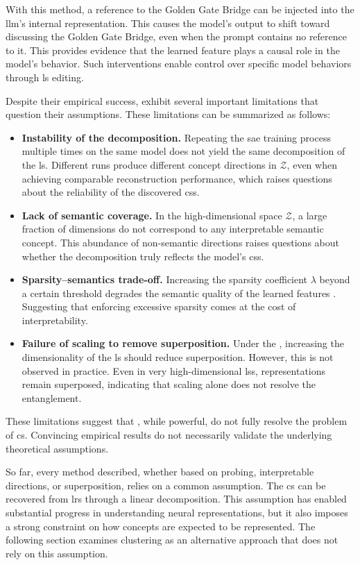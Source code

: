 With this method, a reference to the Golden Gate Bridge can be injected into the \gls{llm}'s internal representation.
This causes the model's output to shift toward discussing the Golden Gate Bridge, even when the prompt contains no reference to it.
This provides evidence that the learned feature plays a causal role in the model's behavior.
Such interventions enable control over specific model behaviors through \gls{ls} editing.

Despite their empirical success, \SuperpositionHypothesisName exhibit several important limitations that question their assumptions. 
These limitations can be summarized as follows:
\begin{itemize}
    \item \textbf{Instability of the decomposition.}
    Repeating the \gls{sae} training process multiple times on the same model does not yield the same decomposition of the \gls{ls}.
    Different runs produce different concept directions in $\mathcal{Z}$, even when achieving comparable reconstruction performance, which raises questions about the reliability of the discovered \glspl{cs}.

    \item \textbf{Lack of semantic coverage.}
    In the high-dimensional space $\mathcal{Z}$, a large fraction of dimensions do not correspond to any interpretable semantic concept.
    This abundance of non-semantic directions raises questions about whether the decomposition truly reflects the model's \glspl{cs}.

    \item \textbf{Sparsity--semantics trade-off.}
    Increasing the sparsity coefficient $\lambda$ beyond a certain threshold degrades the semantic quality of the learned features \parencite{tanhPenaltyDictionaryLearning}.
    Suggesting that enforcing excessive sparsity comes at the cost of interpretability.

    \item \textbf{Failure of scaling to remove superposition.}
    Under the \SuperpositionHypothesisName, increasing the dimensionality of the \gls{ls} should reduce superposition.
    However, this is not observed in practice.
    Even in very high-dimensional \glspl{ls}, representations remain superposed, indicating that scaling alone does not resolve the entanglement.
\end{itemize}

These limitations suggest that \SuperpositionHypothesisName, while powerful, do not fully resolve the problem of \gls{cs}.
Convincing empirical results do not necessarily validate the underlying theoretical assumptions.

So far, every method described, whether based on probing, interpretable directions, or superposition, relies on a common assumption.
The \gls{cs} can be recovered from \glspl{lr} through a linear decomposition.
This assumption has enabled substantial progress in understanding neural representations, but it also imposes a strong constraint on how concepts are expected to be represented.
The following section examines clustering as an alternative approach that does not rely on this assumption.